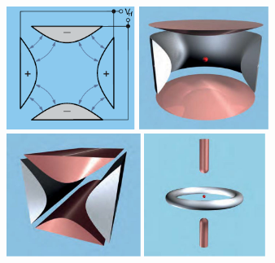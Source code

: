 \documentclass[
  journal=largetwo,
  year=2023,
]{cup-journal}
\begin{document}
\noindent



\begin{figure}
  \centering
  \includegraphics[height=4cm]{figs/fig1/g96736.pdf}
  \includegraphics[height=4cm]{figs/fig1/p5_6.png}
  \includegraphics[height=4cm]{figs/fig1/p5_5.png}
  \includegraphics[height=4cm]{figs/fig1/p5_4.png}


\end{figure}
\end{document}
